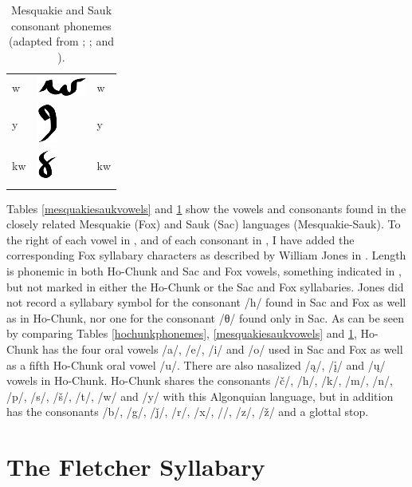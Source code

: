 \documentclass[output=paper]{LSP/langsci}
\begin{document}
\begin{table}
\begin{tabular}{lll}
w & \includegraphics{figures/Danker2w} & w\\
y & \includegraphics{figures/Danker2y} & y\\
kw & \includegraphics{figures/Danker2kw} & kw\\
\lspbottomrule
\end{tabular}
\caption{Mesquakie and Sauk consonant phonemes (adapted from \citealt{NatLangMeskSauk}; \citealt{Susman1939}; and \citealt{Jones1906}).}
\label{mesquakiesaukconsonants}
\end{table}

Tables \ref{mesquakiesaukvowels} and \ref{mesquakiesaukconsonants} show the vowels and consonants found in the closely related Me\-squa\-kie (Fox) and Sauk (Sac) languages (Mesquakie-Sauk). To the right of each vowel in , and of each consonant in , I have added the corresponding Fox syllabary characters as described by William Jones in \citeyear{Jones1906}. Length is phonemic in both Ho-Chunk and Sac and Fox vowels, something indicated in , but not marked in either the Ho-Chunk or the Sac and Fox syllabaries. Jones did not record a syllabary symbol for the consonant /h/ found in Sac and Fox as well as in Ho-Chunk, nor one for the consonant /θ/ found only in Sac. As can be seen by comparing Tables \ref{hochunkphonemes}, \ref{mesquakiesaukvowels} and \ref{mesquakiesaukconsonants}, Ho-Chunk has the four oral vowels /a/, /e/, /i/ and /o/ used in Sac and Fox as well as a fifth Ho-Chunk oral vowel /u/. There are also nasalized /\k{a}/, /\k{i}/ and /\k{u}/ vowels in Ho-Chunk. Ho-Chunk shares the consonants /č/, /h/, /k/, /m/, /n/, /p/, /s/, /\v{s}/, /t/, /w/ and /y/ with this Algonquian language, but in addition has the consonants /b/, /g/, /\v{j}/, /r/, /x/, //, /z/, /\v{z}/ and a glottal stop.
				
\section{The Fletcher Syllabary}
\end{document}
